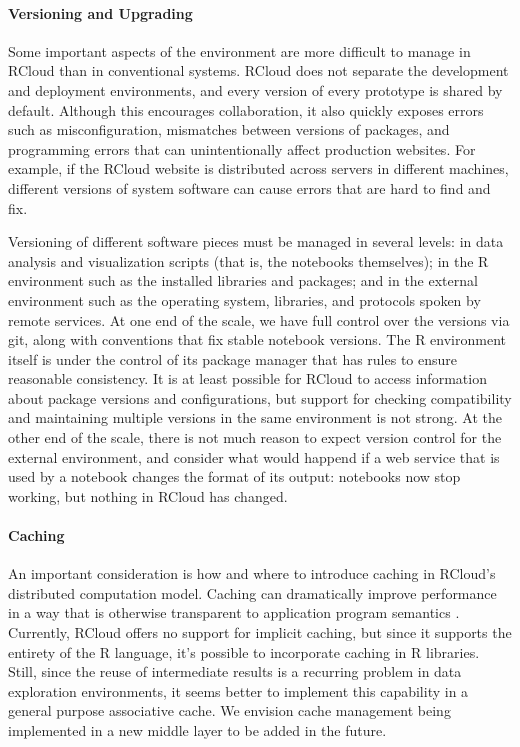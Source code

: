 \paragraph*{Versioning and Upgrading}
Some important aspects of the environment are more difficult to manage
in RCloud than in conventional systems. RCloud does not separate the
development and deployment environments, and every version of every
prototype is shared by default. Although this encourages
collaboration, it also quickly exposes errors such as
misconfiguration, mismatches between versions of packages, and
programming errors that can unintentionally affect production
websites. For example, if the RCloud website is distributed across
servers in different machines, different versions of system software
can cause errors that are hard to find and fix.

Versioning of different software pieces must be managed in several
levels: in data analysis and visualization scripts (that is, the
notebooks themselves); in the R environment such as the installed
libraries and packages; and in the external environment such as the
operating system, libraries, and protocols spoken by remote
services. At one end of the scale, we have full control over the
versions via git, along with conventions that fix stable notebook
versions.  The R environment itself is under the control of its
package manager that has rules to ensure reasonable consistency.  It
is at least possible for RCloud to access information about package
versions and configurations, but support for checking compatibility
and maintaining multiple versions in the same environment is not
strong.  At the other end of the scale, there is not much reason to
expect version control for the external environment, and consider what
would happend if a web service that is used by a notebook changes the
format of its output: notebooks now stop working, but nothing in
RCloud has changed.


\paragraph*{Caching}
An important consideration is how and where to introduce caching in
RCloud's distributed computation model. Caching can dramatically
improve performance in a way that is otherwise transparent to
application program semantics \cite{Callahan:2006:VVM, Guo:2010:TPI}.
Currently, RCloud offers no support for implicit caching, but since it
supports the entirety of the R language, it's possible to incorporate
caching in R libraries.  Still, since the reuse of intermediate
results is a recurring problem in data exploration environments, it
seems better to implement this capability in a general purpose
associative cache. We envision cache management being implemented in a
new middle layer to be added in the future.

